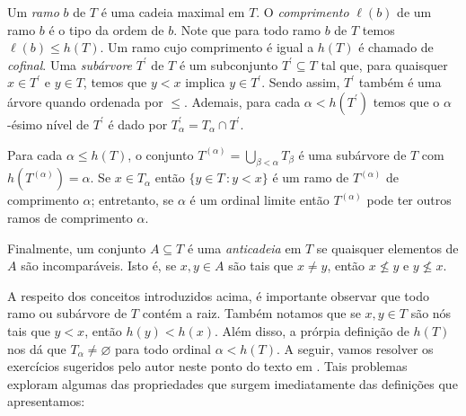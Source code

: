 \documentclass[a4paper]{article}
\theoremstyle{plain}\newtheorem{teo}{Teorema}[section]
\begin{document}
Um \emph{ramo} \(b\) de \(T\) é uma cadeia maximal em \(T\).  O \emph{comprimento}
\(\ell(b)\) de um ramo \(b\) é o tipo da ordem de \(b\). Note que para
todo ramo \(b\) de \(T\) temos \(\ell (b)\leq h(T)\).
Um ramo cujo comprimento é igual a \(h(T)\) é chamado de \emph{cofinal}.
Uma \emph{subárvore} \(T^\prime\) de \(T\) é um subconjunto
\(T^\prime\subseteq T\) tal que, para quaisquer \(x\in T^\prime\) e \(y\in T\),
temos que \(y<x\) implica \(y\in T^\prime\).
Sendo assim, \(T^\prime\) também é uma árvore quando ordenada por \(\leq\).
Ademais, para cada \(\alpha < h(T^\prime)\) temos que o \(\alpha\)-ésimo nível
de \(T^\prime\) é dado por \(T_\alpha^\prime= T_\alpha \cap T^\prime\).

 Para cada \(\alpha\leq h(T)\), o conjunto \(T^{(\alpha)}=\bigcup_{\beta <
   \alpha} T_\beta\) é uma subárvore de \(T\) com  \(h(T^{(\alpha)})=\alpha\).
 Se \(x\in T_\alpha\) então \(\{y\in T\,\colon y < x\}\) é um ramo de \(T^{(\alpha)}\) de
comprimento \(\alpha\); entretanto, se \(\alpha\) é um ordinal limite então
\(T^{(\alpha)}\) pode ter outros ramos de comprimento \(\alpha\).

Finalmente, um conjunto \(A\subseteq T\) é uma \emph{anticadeia} em \(T\) se
quaisquer elementos de \(A\) são incomparáveis. Isto é, se \(x,y\in A\) são tais
que \(x\not = y\), então \(x\not \leq y\) e \(y\not \leq x\).

A respeito dos conceitos introduzidos acima, é importante observar que todo
ramo ou subárvore de \(T\) contém a raiz. Também notamos que se \(x,y\in T\)
são nós tais que \(y< x\), então \(h(y) <h(x)\). Além disso, a prórpia definição
de \(h(T)\) nos dá que \(T_\alpha\not=\varnothing\) para todo ordinal
\(\alpha<h(T)\). A seguir, vamos resolver os
exercícios sugeridos pelo autor neste ponto do texto em \cite{jech}. Tais problemas
exploram algumas das propriedades que surgem imediatamente das
definições que apresentamos:
\end{document}
